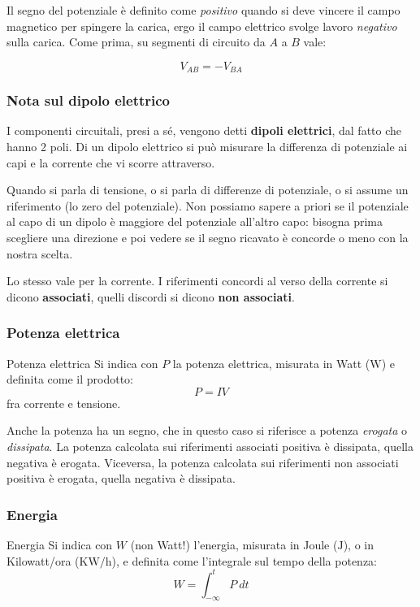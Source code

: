 \documentclass[a4paper,11pt]{article}
\begin{document}
Il segno del potenziale è definito come \textit{positivo} quando si deve vincere il campo magnetico per spingere la carica, ergo il campo elettrico svolge lavoro \textit{negativo} sulla carica.
Come prima, su segmenti di circuito da $A$ a $B$ vale:

$$
V_{AB} = -V_{BA}
$$

\subsubsection{Nota sul dipolo elettrico}
I componenti circuitali, presi a sé, vengono detti \textbf{dipoli elettrici}, dal fatto che hanno 2 poli.
Di un dipolo elettrico si può misurare la differenza di potenziale ai capi e la corrente che vi scorre attraverso.

Quando si parla di tensione, o si parla di differenze di potenziale, o si assume un riferimento (lo zero del potenziale).
Non possiamo sapere a priori se il potenziale al capo di un dipolo è maggiore del potenziale all'altro capo: bisogna prima scegliere una direzione e poi vedere se il segno ricavato è concorde o meno con la nostra scelta.

Lo stesso vale per la corrente.
I riferimenti concordi al verso della corrente si dicono \textbf{associati}, quelli discordi si dicono \textbf{non associati}.

\subsubsection{Potenza elettrica}

\begin{definition}{Potenza elettrica}
Si indica con $P$ la potenza elettrica, misurata in Watt ($\mathrm{W}$) e definita come il prodotto:
$$
	P = IV
$$
fra corrente e tensione.
\end{definition}

Anche la potenza ha un segno, che in questo caso si riferisce a potenza \textit{erogata} o \textit{dissipata}.
La potenza calcolata sui riferimenti associati positiva è dissipata, quella negativa è erogata.
Viceversa, la potenza calcolata sui riferimenti non associati positiva è erogata, quella negativa è dissipata.

\subsubsection{Energia}

\begin{definition}{Energia}
Si indica con $W$ (non Watt!) l'energia, misurata in Joule ($\mathrm{J}$), o in Kilowatt/ora ($\mathrm{KW/h}$), e definita come l'integrale sul tempo della potenza:
$$
W = \int_{-\infty}^t P \ dt 
$$
\end{definition}
\end{document}
